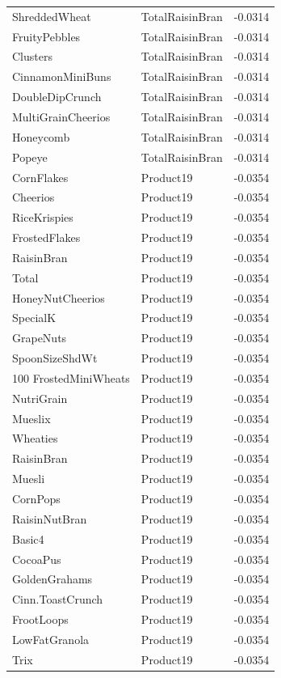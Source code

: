 \begin{longtable}{llr}
ShreddedWheat & TotalRaisinBran & -0.0314 \\
FruityPebbles & TotalRaisinBran & -0.0314 \\
Clusters & TotalRaisinBran & -0.0314 \\
CinnamonMiniBuns & TotalRaisinBran & -0.0314 \\
DoubleDipCrunch & TotalRaisinBran & -0.0314 \\
MultiGrainCheerios & TotalRaisinBran & -0.0314 \\
Honeycomb & TotalRaisinBran & -0.0314 \\
Popeye & TotalRaisinBran & -0.0314 \\
CornFlakes & Product19 & -0.0354 \\
Cheerios & Product19 & -0.0354 \\
RiceKrispies & Product19 & -0.0354 \\
FrostedFlakes & Product19 & -0.0354 \\
RaisinBran & Product19 & -0.0354 \\
Total & Product19 & -0.0354 \\
HoneyNutCheerios & Product19 & -0.0354 \\
SpecialK & Product19 & -0.0354 \\
GrapeNuts & Product19 & -0.0354 \\
SpoonSizeShdWt & Product19 & -0.0354 \\
100%
FrostedMiniWheats & Product19 & -0.0354 \\
NutriGrain & Product19 & -0.0354 \\
Mueslix & Product19 & -0.0354 \\
Wheaties & Product19 & -0.0354 \\
RaisinBran & Product19 & -0.0354 \\
Muesli & Product19 & -0.0354 \\
CornPops & Product19 & -0.0354 \\
RaisinNutBran & Product19 & -0.0354 \\
Basic4 & Product19 & -0.0354 \\
CocoaPus & Product19 & -0.0354 \\
GoldenGrahams & Product19 & -0.0354 \\
Cinn.ToastCrunch & Product19 & -0.0354 \\
FrootLoops & Product19 & -0.0354 \\
LowFatGranola & Product19 & -0.0354 \\
Trix & Product19 & -0.0354 \\

\end{longtable}
